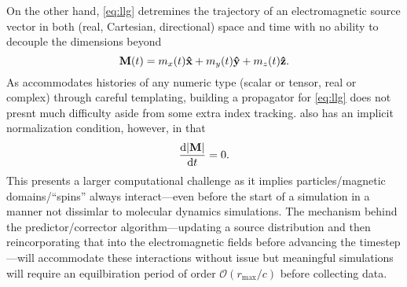 On the other hand, \cref{eq:llg} detremines the trajectory of an electromagnetic source vector in both (real, Cartesian, directional) space and time with no ability to decouple the dimensions beyond
\begin{equation}
  \vb{M}(t) = m_x(t) \vu{x} + m_y(t) \vu{y} + m_z(t) \vu{z}.
\end{equation}
As \QuEST{} accommodates histories of any numeric type (scalar or tensor, real or complex) through careful templating, building a propagator for \cref{eq:llg} does not presnt much difficulty aside from some extra index tracking.
 also has an implicit normalization condition, however, in that
\begin{equation}
  \dv{\abs{\vb{M}}}{t} = 0.
\end{equation}
This presents a larger computational challenge as it implies particles/magnetic domains/``spins'' always interact---even before the start of a simulation in a manner not dissimlar to molecular dynamics simulations.
The mechanism behind the predictor/corrector algorithm---updating a source distribution and then reincorporating that into the electromagnetic fields before advancing the timestep---will accommodate these interactions without issue but meaningful simulations will require an equilbiration period of order $\mathcal{O}(r_\text{max}/c)$ before collecting data.
